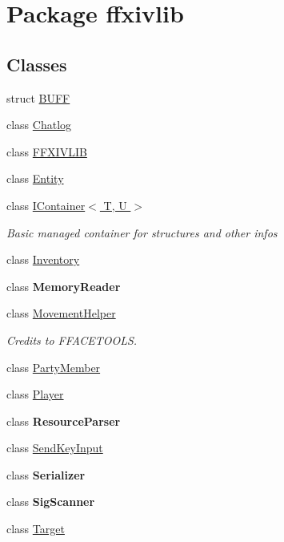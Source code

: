 \hypertarget{namespaceffxivlib}{\section{Package ffxivlib}
\label{namespaceffxivlib}
}
\subsection*{Classes}
\begin{DoxyCompactItemize}
\item 
struct \hyperlink{structffxivlib_1_1_b_u_f_f}{B\-U\-F\-F}
\item 
class \hyperlink{classffxivlib_1_1_chatlog}{Chatlog}
\item 
class \hyperlink{classffxivlib_1_1_f_f_x_i_v_l_i_b}{F\-F\-X\-I\-V\-L\-I\-B}
\item 
class \hyperlink{classffxivlib_1_1_entity}{Entity}
\item 
class \hyperlink{classffxivlib_1_1_i_container_3_01_t_00_01_u_01_4}{I\-Container$<$ T, U $>$}
\begin{DoxyCompactList}\small\item\em Basic managed container for structures and other infos \end{DoxyCompactList}\item 
class \hyperlink{classffxivlib_1_1_inventory}{Inventory}
\item 
class {\bfseries Memory\-Reader}
\item 
class \hyperlink{classffxivlib_1_1_movement_helper}{Movement\-Helper}
\begin{DoxyCompactList}\small\item\em Credits to F\-F\-A\-C\-E\-T\-O\-O\-L\-S. \end{DoxyCompactList}\item 
class \hyperlink{classffxivlib_1_1_party_member}{Party\-Member}
\item 
class \hyperlink{classffxivlib_1_1_player}{Player}
\item 
class {\bfseries Resource\-Parser}
\item 
class \hyperlink{classffxivlib_1_1_send_key_input}{Send\-Key\-Input}
\item 
class {\bfseries Serializer}
\item 
class {\bfseries Sig\-Scanner}
\item 
class \hyperlink{classffxivlib_1_1_target}{Target}
\end{DoxyCompactItemize}
